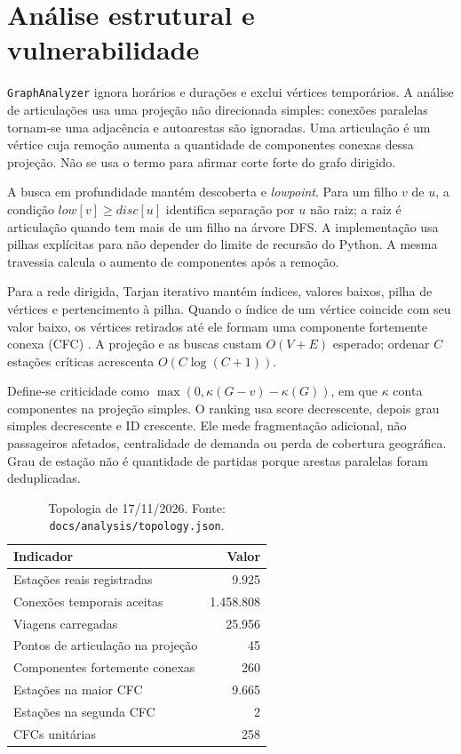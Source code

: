 \documentclass[12pt]{article}
\newcommand{\code}[1]{\texttt{#1}}
\begin{document}
\section{Análise estrutural e vulnerabilidade}
\code{GraphAnalyzer} ignora horários e durações e exclui vértices temporários. A análise de articulações usa uma projeção não direcionada simples: conexões paralelas tornam-se uma adjacência e autoarestas são ignoradas. Uma articulação é um vértice cuja remoção aumenta a quantidade de componentes conexas dessa projeção. Não se usa o termo para afirmar corte forte do grafo dirigido.

A busca em profundidade mantém descoberta e \emph{lowpoint}. Para um filho $v$ de $u$, a condição $low[v]\geq disc[u]$ identifica separação por $u$ não raiz; a raiz é articulação quando tem mais de um filho na árvore DFS. A implementação usa pilhas explícitas para não depender do limite de recursão do Python. A mesma travessia calcula o aumento de componentes após a remoção.

Para a rede dirigida, Tarjan iterativo mantém índices, valores baixos, pilha de vértices e pertencimento à pilha. Quando o índice de um vértice coincide com seu valor baixo, os vértices retirados até ele formam uma componente fortemente conexa (CFC) \cite{tarjan}. A projeção e as buscas custam $O(V+E)$ esperado; ordenar $C$ estações críticas acrescenta $O(C\log(C+1))$.

Define-se criticidade como $\max(0,\kappa(G-v)-\kappa(G))$, em que $\kappa$ conta componentes na projeção simples. O ranking usa score decrescente, depois grau simples decrescente e ID crescente. Ele mede fragmentação adicional, não passageiros afetados, centralidade de demanda ou perda de cobertura geográfica. Grau de estação não é quantidade de partidas porque arestas paralelas foram deduplicadas.

\begin{table}[ht]
\centering
\caption{Topologia de 17/11/2026. Fonte: \texttt{docs/analysis/topology.json}.}
\label{tab:topology}
\begin{tabular}{@{}lr@{}}
\toprule Indicador & Valor \\
\midrule
Estações reais registradas & 9.925 \\
Conexões temporais aceitas & 1.458.808 \\
Viagens carregadas & 25.956 \\
Pontos de articulação na projeção & 45 \\
Componentes fortemente conexas & 260 \\
Estações na maior CFC & 9.665 \\
Estações na segunda CFC & 2 \\
CFCs unitárias & 258 \\
\bottomrule
\end{tabular}
\end{table}
\end{document}
